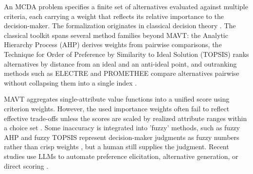 \documentclass[final,3p,times]{elsarticle}
\begin{document}
An MCDA problem specifies a finite set of alternatives evaluated against multiple criteria, each carrying a weight that reflects its relative importance to the decision-maker. The formalization originates in classical decision theory \cite{keeneyraiffa1976,dyer1979}. The classical toolkit spans several method families beyond MAVT: the Analytic Hierarchy Process (AHP) derives weights from pairwise comparisons, the Technique for Order of Preference by Similarity to Ideal Solution (TOPSIS) ranks alternatives by distance from an ideal and an anti-ideal point, and outranking methods such as ELECTRE and PROMETHEE compare alternatives pairwise without collapsing them into a single index \cite{huang2011}. 

MAVT aggregates single-attribute value functions into a unified score using criterion weights. However, the used importance weights often fail to reflect effective trade-offs unless the scores are scaled by realized attribute ranges within a choice set \cite{vonnitzsch1993}. Some inaccuracy is integrated into 'fuzzy' methods, such as fuzzy AHP and fuzzy TOPSIS represent decision-maker judgments as fuzzy numbers rather than crisp weights \cite{zadeh1965}, but a human still supplies the judgment. Recent studies use LLMs to automate preference elicitation, alternative generation, or direct scoring \cite{svoboda2024,icaart26}.
\end{document}
